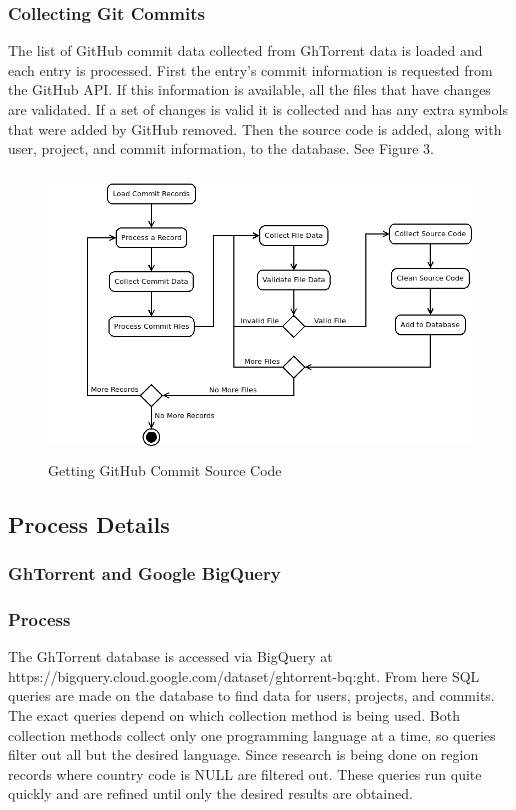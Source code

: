 \documentclass{article}
\begin{document}
\subsubsection*{Collecting Git Commits}
The list of GitHub commit data collected from GhTorrent data is loaded and each entry is processed. First the entry's commit information is requested from the GitHub API. If this information is available, all the files that have changes are validated. If a set of changes is valid it is collected and has any extra symbols that were added by GitHub removed. Then the source code is added, along with user, project, and commit information, to the database.  See Figure 3.

\begin{figure}[t]
    \centering
    \includegraphics[height=7.5cm]{diagrams/commits.png}
    \caption{Getting GitHub Commit Source Code}
\end{figure}


\subsection{Process Details}

\subsubsection{GhTorrent and Google BigQuery}

\subsubsection*{Process}
The GhTorrent database is accessed via BigQuery at\linebreak
https://bigquery.cloud.google.com/dataset/ghtorrent-bq:ght. From here SQL queries are made on the database to find data for users, projects, and commits. The exact queries depend on which collection method is being used. Both collection methods collect only one programming language at a time, so queries filter out all but the desired language. Since research is being done on region records where country code is NULL are filtered out. These queries run quite quickly and are refined until only the desired results are obtained.
\end{document}
